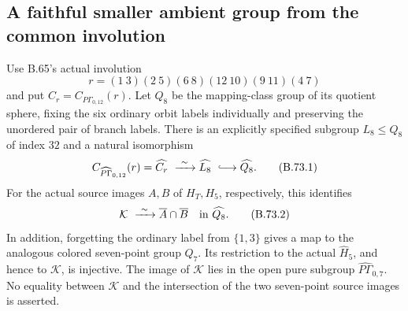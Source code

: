 \subsection*{A faithful smaller ambient group from the common involution}

Use B.65's actual involution
\[
 r=(1\ 3)(2\ 5)(6\ 8)(12\ 10)(9\ 11)(4\ 7)
\]
and put \(C_r=C_{P\Gamma_{0,12}}(r)\).
Let \(Q_8\) be the mapping-class group of its quotient sphere,
fixing the six ordinary orbit labels individually and preserving
the unordered pair of branch labels.
There is an explicitly specified subgroup \(L_8\leq Q_8\) of index
\(32\) and a natural isomorphism
\[
 C_{\widehat{P\Gamma}_{0,12}}(r)
       =\widehat{C_r}\ \xrightarrow{\ \sim\ }\widehat{L_8}
                  \ \lhook\joinrel\longrightarrow\widehat{Q_8}.
                                                               \tag{B.73.1}
\]
For the actual source images \(A,B\) of \(H_T,H_5\), respectively,
this identifies
\[
             \mathcal K\ \xrightarrow{\ \sim\ }
                      \overline A\cap\overline B
                         \quad\hbox{in }\widehat{Q_8}.           \tag{B.73.2}
\]
In addition, forgetting the ordinary label from \(\{1,3\}\)
gives a map to the analogous colored seven-point group \(Q_7\).
Its restriction to the actual \(\widehat H_5\), and hence to
\(\mathcal K\), is injective.  The image of \(\mathcal K\)
lies in the open pure subgroup \(\widehat{P\Gamma}_{0,7}\).
No equality between \(\mathcal K\) and the intersection of
the two seven-point source images is asserted.

